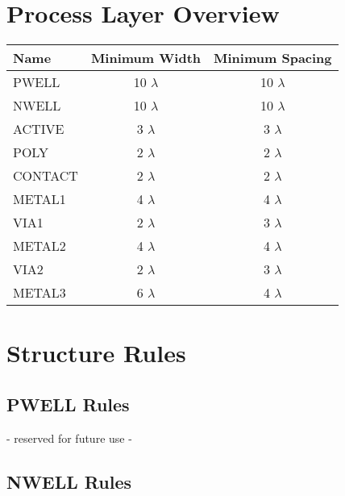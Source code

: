 \section{Process Layer Overview}\label{design_rules_process_layer_overview}

\begin{center}
    \begin{tabular}{|l|c|c|}
    \hline
        \textbf{Name} & \textbf{Minimum Width} & \textbf{Minimum Spacing} \\
    \hline
        PWELL   & 10 $\lambda$ & 10 $\lambda$ \\
        NWELL   & 10 $\lambda$ & 10 $\lambda$ \\
        ACTIVE  & 3  $\lambda$ & 3  $\lambda$ \\
        POLY    & 2  $\lambda$ & 2  $\lambda$ \\
        CONTACT & 2  $\lambda$ & 2  $\lambda$ \\
        METAL1  & 4  $\lambda$ & 4  $\lambda$ \\
        VIA1    & 2  $\lambda$ & 3  $\lambda$ \\
        METAL2  & 4  $\lambda$ & 4  $\lambda$ \\
        VIA2    & 2  $\lambda$ & 3  $\lambda$ \\
        METAL3  & 6  $\lambda$ & 4  $\lambda$ \\
    \hline
    \end{tabular}
\end{center}

\section{Structure Rules}\label{design_rules_structure_rules}

\subsection{PWELL Rules}\label{design_rules_pwell_rules}

\begin{center}
- reserved for future use -
\end{center}

\subsection{NWELL Rules}\label{design_rules_nwell_rules}

